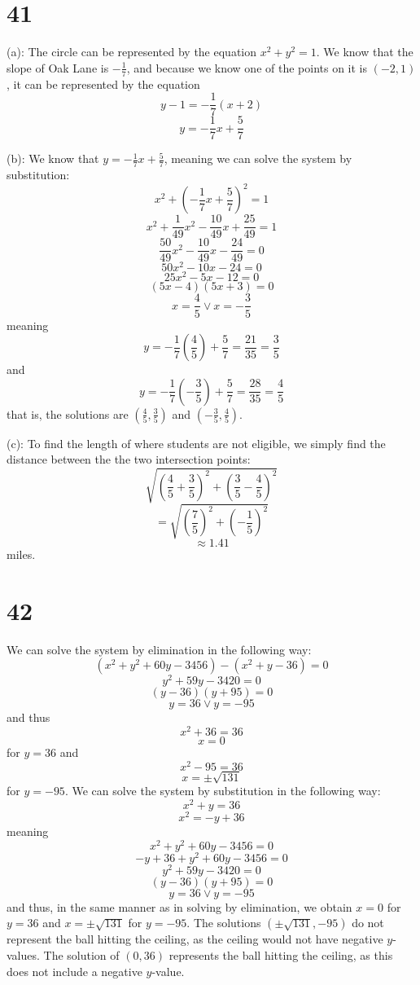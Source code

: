 \documentclass{article}
\theoremstyle{definition}
\newcommand{\?}{\stackrel{?}{=}}
\begin{document}
\section*{41}
(a): The circle can be represented by the equation $x^2+y^2=1$. We know that the slope of Oak Lane is $-\frac{1}{7}$, and because we know one of the points on it is $(-2,1)$, it can 
be represented by the equation 
\[ y-1=-\frac{1}{7}(x+2) \]
\[ y=-\frac{1}{7}x+\frac{5}{7} \]


(b): We know that $y=-\frac{1}{7}x+\frac{5}{7}$, meaning we can solve the system by substitution:
\[ x^2+(-\frac{1}{7}x+\frac{5}{7})^2=1 \]
\[ x^2+\frac{1}{49}x^2-\frac{10}{49}x+\frac{25}{49}=1 \]
\[ \frac{50}{49}x^2-\frac{10}{49}x-\frac{24}{49}=0 \]
\[ 50x^2-10x-24=0 \]
\[ 25x^2-5x-12=0 \]
\[ (5x-4)(5x+3)=0 \]
\[ x=\frac{4}{5}\vee x=-\frac{3}{5} \]
meaning
\[ y=-\frac{1}{7}(\frac{4}{5})+\frac{5}{7}=\frac{21}{35}=\frac{3}{5} \]
and \[ y=-\frac{1}{7}(-\frac{3}{5})+\frac{5}{7}=\frac{28}{35}=\frac{4}{5} \]
that is, the solutions are $(\frac{4}{5},\frac{3}{5})$ and $(-\frac{3}{5},\frac{4}{5})$.


(c): To find the length of where students are not eligible, we simply find the distance between the the two intersection points:
\[ \sqrt{(\frac{4}{5}+\frac{3}{5})^2+(\frac{3}{5}-\frac{4}{5})^2} \]
\[ =\sqrt{(\frac{7}{5})^2+(-\frac{1}{5})^2} \]
\[ \approx 1.41 \] miles. 

\section*{42}
We can solve the system by elimination in the following way:
\[ (x^2+y^2+60y-3456)-(x^2+y-36)=0 \]
\[ y^2+59y-3420=0 \]
\[ (y-36)(y+95)=0 \]
\[ y=36\vee y=-95 \]
and thus \[ x^2+36=36 \] \[ x=0 \] for $y=36$ and \[ x^2-95=36 \] \[ x=\pm\sqrt{131} \] for $y=-95$.
We can solve the system by substitution in the following way:
\[ x^2+y=36 \] \[ x^2=-y+36 \] meaning
\[ x^2+y^2+60y-3456=0 \]
\[ -y+36+y^2+60y-3456=0 \]
\[ y^2+59y-3420=0 \]
\[ (y-36)(y+95)=0 \]
\[ y=36\vee y=-95 \]
and thus, in the same manner as in solving by elimination, we obtain $x=0$ for $y=36$ and $x=\pm\sqrt{131}$ for $y=-95$. The solutions 
$(\pm\sqrt{131},-95)$ do not represent the ball hitting the ceiling, as the ceiling would not have negative $y$-values. The solution of $(0,36)$ represents the ball hitting the ceiling, as 
this does not include a negative $y$-value.
\end{document}
